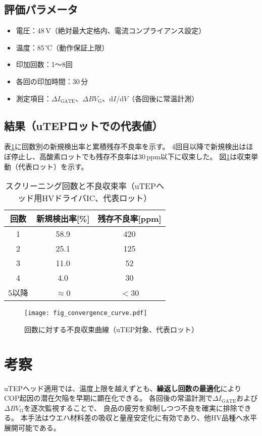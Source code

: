 \documentclass[twocolumn]{ieeetran}
\begin{document}
\subsection{評価パラメータ}
\begin{itemize}
\item 電圧：48\,V（絶対最大定格内、電流コンプライアンス設定）
\item 温度：85\,℃（動作保証上限）
\item 印加回数：1～8回
\item 各回の印加時間：30\,分
\item 測定項目：$\Delta I_\mathrm{GATE}$、$\Delta BV_\mathrm{G}$、d$I$/d$V$（各回後に常温計測）
\end{itemize}

\subsection{結果（uTEPロットでの代表値）}
表\ref{tab_results}に回数別の新規検出率と累積残存不良率を示す。
4回目以降で新規検出はほぼ停止し、高酸素ロットでも残存不良率は30\,ppm以下に収束した。
図\ref{fig_convergence}は収束挙動（代表ロット）を示す。

\begin{table}[t]
\centering
\caption{スクリーニング回数と不良収束率（uTEPヘッド用HVドライバIC、代表ロット）}
\label{tab_results}
\begin{tabular}{ccc}
\toprule
回数 & 新規検出率[\%] & 残存不良率[ppm] \\
\midrule
1 & 58.9 & 420 \\
2 & 25.1 & 125 \\
3 & 11.0 & 52 \\
4 & 4.0  & 30 \\
5以降 & $\approx$0 & $<$30 \\
\bottomrule
\end{tabular}
\end{table}

\begin{figure}[t]
  \centering
  \texttt{[image: fig\_convergence\_curve.pdf]}
  \caption{回数に対する不良収束曲線（uTEP対象、代表ロット）}
  \label{fig_convergence}
\end{figure}

\section{考察}
uTEPヘッド適用では、温度上限を越えずとも、\textbf{繰返し回数の最適化}により
COP起因の潜在欠陥を早期に顕在化できる。
各回後の常温計測で$\Delta I_\mathrm{GATE}$および$\Delta BV_\mathrm{G}$を逐次監視することで、
良品の疲労を抑制しつつ不良を確実に排除できる。
本手法はウエハ材料差の吸収と量産安定化に有効であり、他HV品種へ水平展開可能である。
\end{document}
